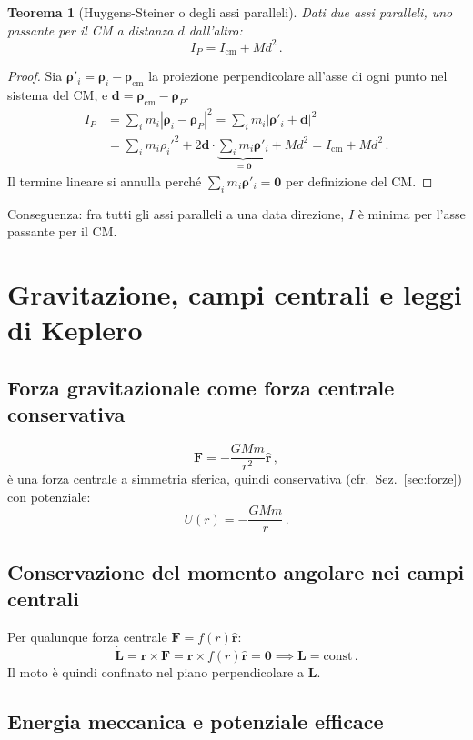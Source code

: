 \documentclass[11pt,a4paper]{article}
\renewcommand{\vec}[1]{\bm{#1}}
\newcommand{\rhat}{\hat{\bm{r}}}
\newcommand{\CM}{\mathrm{cm}}
\theoremstyle{plain}
\newtheorem{teorema}{Teorema}[section]
\theoremstyle{definition}
\theoremstyle{remark}
\begin{document}
\begin{teorema}[Huygens-Steiner o degli assi paralleli]
Dati due assi paralleli, uno passante per il CM a distanza $d$ dall'altro:
\[
  I_P=I_\CM+Md^2\,.
\]
\end{teorema}
\begin{proof}
Sia $\vec{\rho}'_i=\vec{\rho}_i-\vec{\rho}_\CM$ la proiezione perpendicolare
all'asse di ogni punto nel sistema del CM, e $\vec{d}=\vec{\rho}_\CM-\vec{\rho}_P$.
\begin{align*}
  I_P&=\sum_i m_i|\vec{\rho}_i-\vec{\rho}_P|^2
      =\sum_i m_i|\vec{\rho}'_i+\vec{d}|^2\\
     &=\sum_i m_i\rho_i'^2
       +2\vec{d}\cdot\underbrace{\sum_i m_i\vec{\rho}'_i}_{=\vec{0}}
       +Md^2
      =I_\CM+Md^2\,.
\end{align*}
Il termine lineare si annulla perché $\sum_i m_i\vec{\rho}'_i=\vec{0}$ per
definizione del CM.
\end{proof}
Conseguenza: fra tutti gli assi paralleli a una data direzione, $I$ è minima
per l'asse passante per il CM.

\section{Gravitazione, campi centrali e leggi di Keplero}

\subsection{Forza gravitazionale come forza centrale conservativa}

\[
  \vec{F}=-\frac{GMm}{r^2}\rhat\,,
\]
è una forza centrale a simmetria sferica, quindi conservativa (cfr.\
Sez.~\ref{sec:forze}) con potenziale:
\[
  U(r)=-\frac{GMm}{r}\,.
\]

\subsection{Conservazione del momento angolare nei campi centrali}

Per qualunque forza centrale $\vec{F}=f(r)\rhat$:
\[
  \dot{\vec{L}}=\vec{r}\times\vec{F}=\vec{r}\times f(r)\rhat=\vec{0}\implies\vec{L}=\mathrm{const}\,.
\]
Il moto è quindi confinato nel piano perpendicolare a $\vec{L}$.

\subsection{Energia meccanica e potenziale efficace}
\end{document}

